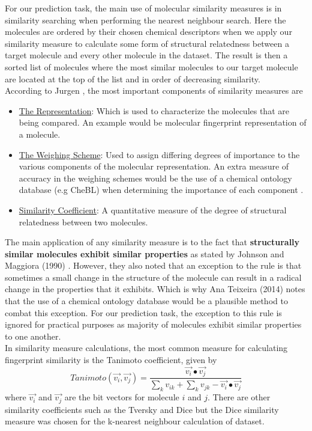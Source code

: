 \documentclass[a4paper,12pt]{report}
\begin{document}
			For our prediction task, the main use of molecular similarity measures is in similarity searching when performing the nearest neighbour search. Here the molecules are ordered by their chosen chemical descriptors when we apply our similarity measure to calculate some form of structural relatedness between a target molecule and every other molecule in the dataset. The result is then a sorted list of molecules where the most similar molecules to our target molecule are located at the top of the list and in order of decreasing similarity.\\
			According to Jurgen \cite{Jurgen2004}, the most important components of similarity measures are
				\begin{itemize}
					\item \underline{The Representation}: Which is used to characterize the molecules that are being compared. An example would be molecular fingerprint representation of a molecule.
					\item \underline{The Weighing Scheme}: Used to assign differing degrees of importance to the various components of the molecular representation. An extra measure of accuracy in the weighing schemes would be the use of a chemical ontology database (e.g CheBL) when determining the importance of each component \cite{AnaPhd2014}.
					\item \underline{Similarity Coefficient}: A quantitative measure of the degree of structural relatedness between two molecules.
				\end{itemize}
			The main application of any similarity measure is to the fact that \textbf{structurally similar molecules exhibit similar properties} as stated by Johnson and Maggiora (1990) \cite{JohnMaggiora1990}. However, they also noted that an exception to the rule is that sometimes a small change in the structure of the molecule can result in a radical change in the properties that it exhibits. Which is why Ana Teixeira (2014) \cite{AnaPhd2014} notes that the use of a chemical ontology database would be a plausible method to combat this exception. For our prediction task, the exception to this rule is ignored for practical purposes as majority of molecules exhibit similar properties to one another.\\
			In similarity measure calculations, the most common measure for calculating fingerprint similarity is the Tanimoto coefficient, given by 
				\begin{equation}
				Tanimoto(\vec{v_i}, \vec{v_j}) = 
				\frac{\vec{v_i}\bullet\vec{v_j}}
				{\sum_{k}v_{ik} + \sum_{k}v_{jk} - \vec{v_i}\bullet\vec{v_j}  } 
				\end{equation}
			where $\vec{v_i}$ and $\vec{v_j}$ are the bit vectors for molecule $i$ and $j$. There are other similarity coefficients such as the Tversky and Dice but the Dice similarity measure was chosen for the k-nearest neighbour calculation of dataset.
	
\end{document}
